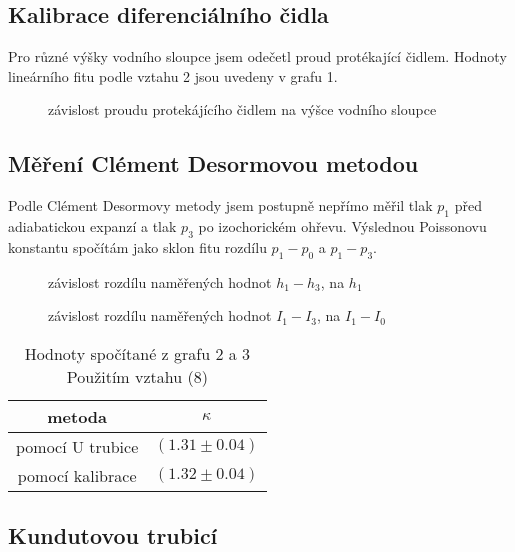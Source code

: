 \documentclass[a4paper,11pt]{article}
\begin{document}
\subsection{Kalibrace diferenciálního čidla}

Pro různé výšky vodního sloupce jsem odečetl proud protékající čidlem. 
Hodnoty lineárního fitu podle vztahu 2 jsou uvedeny v grafu 1.

\begin{figure}[ht]
  \centering
  
  \caption{závislost proudu protekájícího čidlem na výšce vodního sloupce}
\end{figure}

\subsection{Měření Clément Desormovou metodou}

Podle Clément Desormovy metody jsem postupně nepřímo měřil tlak $p_1$ před adiabatickou expanzí a tlak $p_3$ po 
izochorickém ohřevu. Výslednou Poissonovu konstantu spočítám jako sklon fitu rozdílu $p_1 - p_0$ a $p_1 - p_3$.

\begin{figure}[ht]
  \centering
  
  \caption{závislost rozdílu naměřených hodnot $h_1 - h_3$, na $h_1$}
\end{figure}

\newpage

\begin{figure}[ht]
  \centering
  
  \caption{závislost rozdílu naměřených hodnot $I_1 - I_3$, na $I_1 - I_0$}
\end{figure}

\begin{table}[ht]
  \centering
  \begin{tabular}{c | c }
    metoda & $\kappa$ \\ \hline\hline
    pomocí U trubice & $(1.31 \pm 0.04)$ \\
    pomocí kalibrace & $(1.32 \pm 0.04)$ \\ \hline
  \end{tabular}
  \caption{Hodnoty spočítané z grafu 2 a 3 Použitím vztahu (8)}
\end{table}

\subsection{Kundutovou trubicí}
\end{document}

